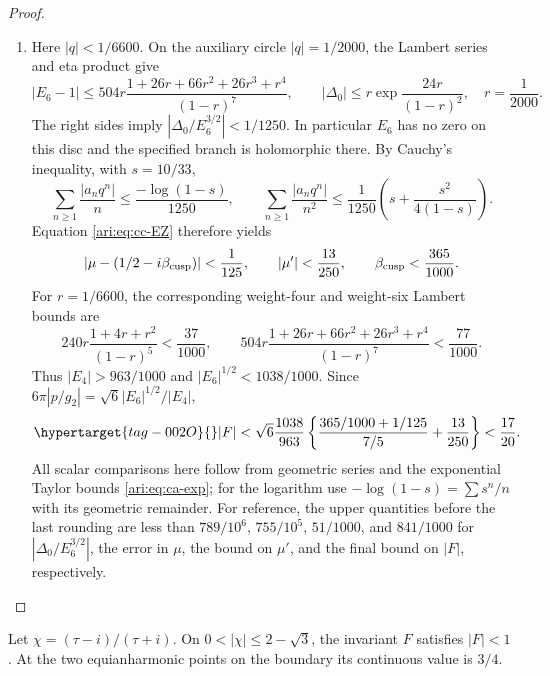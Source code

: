 \begin{proof}
\begin{enumerate}[label=\arabic*.,leftmargin=*]
\item Here $|q|<1/6600$. On the auxiliary circle $|q|=1/2000$,
the Lambert series and eta product give
\[
 |E_6-1|\le
 504r\frac{1+26r+66r^2+26r^3+r^4}{(1-r)^7},\qquad
 |\Delta_0|\le r\exp\!\frac{24r}{(1-r)^2},
 \quad r=\frac1{2000}.
\]
The right sides imply $|\Delta_0/E_6^{3/2}|<1/1250$.
In particular $E_6$ has no zero on this disc and the specified
branch is holomorphic there. By Cauchy's inequality, with
$s=10/33$,
\[
 \sum_{n\ge1}\frac{|a_nq^n|}{n}
 \le\frac{-\log(1-s)}{1250},\qquad
 \sum_{n\ge1}\frac{|a_nq^n|}{n^2}
 \le\frac1{1250}\left(s+\frac{s^2}{4(1-s)}\right).
\]
Equation \eqref{ari:eq:cc-EZ} therefore yields
\[
 |\mu-(1/2-i\beta_{\rm cusp})|<\frac1{125},\qquad
 |\mu'|<\frac{13}{250},\qquad \beta_{\rm cusp}<\frac{365}{1000}.
\]
For $r=1/6600$, the corresponding weight-four and weight-six
Lambert bounds are
\[
 240r\frac{1+4r+r^2}{(1-r)^5}<\frac{37}{1000},\qquad
 504r\frac{1+26r+66r^2+26r^3+r^4}{(1-r)^7}
       <\frac{77}{1000}.
\]
Thus $|E_4|>963/1000$ and $|E_6|^{1/2}<1038/1000$.
Since $6\pi|p/g_2|=\sqrt6|E_6|^{1/2}/|E_4|$,
\begin{equation}\hypertarget{tag-002O}{}\label{ari:eq:cc-cuspbound}
 |F|<\sqrt6\frac{1038}{963}
 \left\{\frac{365/1000+1/125}{7/5}+\frac{13}{250}\right\}
 <\frac{17}{20}.
\end{equation}
All scalar comparisons here follow from geometric series and
the exponential Taylor bounds \eqref{ari:eq:ca-exp}; for the logarithm
use $-\log(1-s)=\sum s^n/n$ with its geometric remainder.
For reference, the upper quantities before the last rounding are
less than $789/10^6$, $755/10^5$, $51/1000$, and $841/1000$
for $|\Delta_0/E_6^{3/2}|$, the error in $\mu$, the bound on
$\mu'$, and the final bound on $|F|$, respectively.
\end{enumerate}
\end{proof}

\begin{proposition}\hypertarget{tag-001O}{}\label{ari:C.8.14}

Let $\chi=(\tau-i)/(\tau+i)$. On
$0<|\chi|\le2-\sqrt3$, the invariant $F$ satisfies $|F|<1$.
At the two equianharmonic points on the boundary its continuous
value is $3/4$.
\end{proposition}


